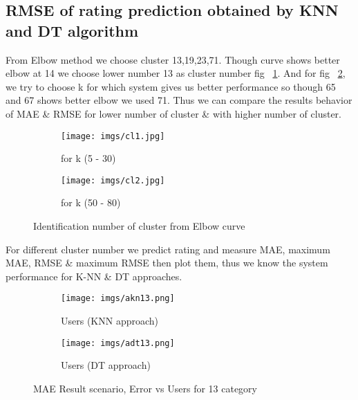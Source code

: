 \documentclass[document.tex]{subfiles}
\begin{document}
	\subsection{RMSE of rating prediction obtained by KNN and DT algorithm}
	From Elbow method we choose cluster 13,19,23,71. Though curve shows better elbow at 14 we choose lower number 13 as cluster number fig ~\ref{fig:cla}. And for fig ~\ref{fig:clb}, we try to choose k for which system gives us better performance so though 65 and 67 shows better elbow we used 71. Thus we can compare the results behavior of MAE \& RMSE for lower number of cluster \& with higher number of cluster. 
	\begin{figure}[H]
		\centering
		\begin{subfigure}[b]{0.49\textwidth}
			\texttt{[image: imgs/cl1.jpg]}
			\caption{for k (5 - 30) }
			\label{fig:cla}
		\end{subfigure}
		\begin{subfigure}[b]{0.49\textwidth}
			\texttt{[image: imgs/cl2.jpg]}
			\caption{for k (50 - 80)}
			\label{fig:clb}
		\end{subfigure}
		\caption{Identification number of cluster from Elbow curve }\label{fig:clusterChoose}
	\end{figure}
For different cluster number we predict rating and measure MAE, maximum MAE, RMSE \& maximum RMSE then plot them, thus we know the system performance for K-NN \& DT approaches.
	
	\begin{figure}[H]
		\centering
		\begin{subfigure}[b]{0.49\textwidth}
			\texttt{[image: imgs/akn13.png]}
			\caption{Users (KNN approach)}
			\label{figkn13}
		\end{subfigure}
		\begin{subfigure}[b]{0.49\textwidth}
			\texttt{[image: imgs/adt13.png]}
			\caption{Users (DT approach)}
			\label{figdt13}
		\end{subfigure}
		\caption{MAE Result scenario,  Error vs Users for 13 category}\label{fig13}
	\end{figure}
	
\end{document}
